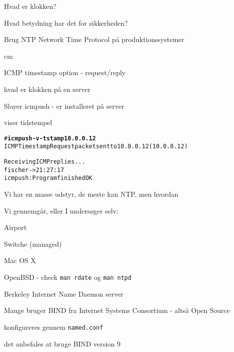 

\begin{list1}
\item Hvad er klokken?
\item Hvad betydning har det for sikkerheden?
\item Brug NTP Network Time Protocol på produktionssystemer
\end{list1}



 cm

\begin{list1}
  \item ICMP timestamp option - request/reply
\item hvad er klokken på en server
\item Slayer icmpush - er installeret på server
\item viser tidstempel
\end{list1}

\begin{alltt}
# {\bfseries icmpush -v -tstamp 10.0.0.12}
ICMP Timestamp Request packet sent to 10.0.0.12 (10.0.0.12)

Receiving ICMP replies ...
fischer         -> 21:27:17
icmpush: Program finished OK
\end{alltt}



\begin{list1}
\item Vi har en masse udstyr, de meste kan NTP, men hvordan
\item Vi gennemgår, eller I undersøger selv:
\begin{list2}
\item Airport
\item Switche (managed)
\item Mac OS X
\item OpenBSD - check \verb+man rdate+ og \verb+man ntpd+
\end{list2}
\end{list1}


\begin{list1}
\item Berkeley Internet Name Daemon server
\item Mange bruger BIND fra Internet Systems Consortium
   - altså Open Source
\item konfigureres gennem \verb+named.conf+
\item det anbefales at bruge BIND version 9
\end{list1}

